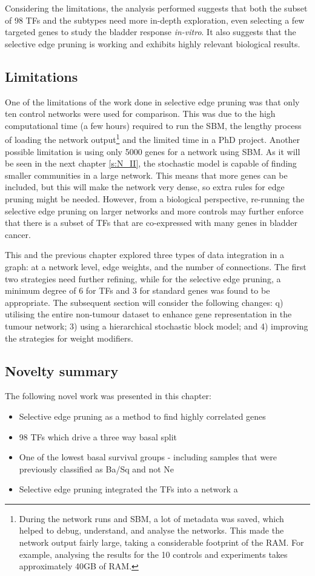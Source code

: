 Considering the limitations, the analysis performed suggests that both the subset of 98 TFs and the subtypes need more in-depth exploration, even selecting a few targeted genes to study the bladder response \textit{in-vitro}. It also suggests that the selective edge pruning is working and exhibits highly relevant biological results.

\subsection* {Limitations}

One of the limitations of the work done in selective edge pruning was that only ten control networks were used for comparison. This was due to the high computational time (a few hours) required to run the SBM, the lengthy process of loading the network output\footnote{During the network runs and SBM, a lot of metadata was saved, which helped to debug, understand, and analyse the networks. This made the network output fairly large, taking a considerable footprint of the RAM. For example, analysing the results for the 10 controls and experiments takes approximately 40GB of RAM.} and the limited time in a PhD project. Another possible limitation is using only 5000 genes for a network using SBM. As it will be seen in the next chapter \cref{s:N_II}, the stochastic model is capable of finding smaller communities in a large network. This means that more genes can be included, but this will make the network very dense, so extra rules for edge pruning might be needed. However, from a biological perspective, re-running the selective edge pruning on larger networks and more controls may further enforce that there is a subset of TFs that are co-expressed with many genes in bladder cancer.


This and the previous chapter explored three types of data integration in a graph: at a network level, edge weights, and the number of connections. The first two strategies need further refining, while for the selective edge pruning, a minimum degree of 6 for TFs and 3 for standard genes was found to be appropriate. The subsequent section will consider the following changes:  q) utilising the entire non-tumour dataset to enhance gene representation in the tumour network; 3) using a hierarchical stochastic block model; and 4) improving the strategies for weight modifiers.


\subsection*{Novelty summary}

The following novel work was presented in this chapter:
\begin{itemize}
    \item Selective edge pruning as a method to find highly correlated genes
    \item 98 TFs which drive a three way basal split
    \item One of the lowest basal survival groups - including samples that were previously classified as Ba/Sq and not Ne
    \item Selective edge pruning integrated the TFs into a network a
\end{itemize}